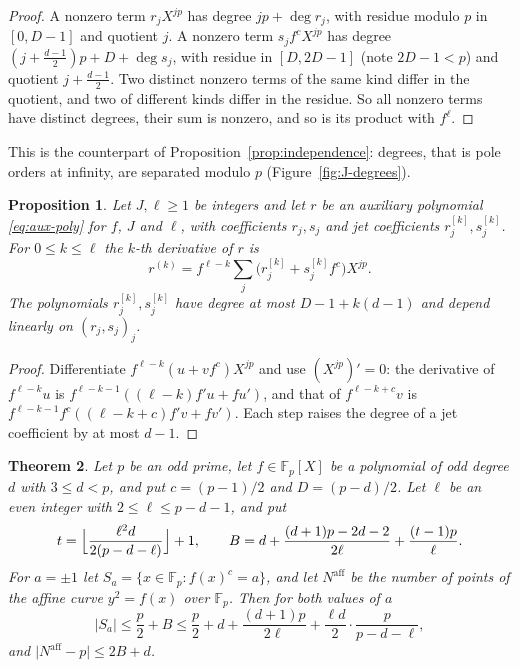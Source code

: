 \documentclass[11pt]{amsbook}
\theoremstyle{plain}
\newtheorem{theorem}{Theorem}[section]
\newtheorem{proposition}[theorem]{Proposition}
\theoremstyle{definition}
\theoremstyle{remark}
\numberwithin{equation}{section}
\numberwithin{figure}{chapter}
\numberwithin{table}{chapter}
\newcommand{\F}{\mathbb{F}}
\begin{document}
\begin{proof}
A nonzero term $r_jX^{jp}$ has degree $jp+\deg r_j$, with residue
modulo $p$ in $[0,D-1]$ and quotient $j$. A nonzero term
$s_jf^cX^{jp}$ has degree $(j+\frac{d-1}2)p+D+\deg s_j$, with
residue in $[D,2D-1]$ (note $2D-1<p$) and quotient
$j+\frac{d-1}2$. Two distinct nonzero terms of the same kind differ
in the quotient, and two of different kinds differ in the residue.
So all nonzero terms have distinct degrees, their sum is nonzero,
and so is its product with $f^\ell$.
\end{proof}

This is the counterpart of Proposition~\ref{prop:independence}:
degrees, that is pole orders at infinity, are separated modulo $p$
(Figure~\ref{fig:J-degrees}).

\begin{proposition}\label{prop:J-jets}
Let $J,\ell\ge1$ be integers and let $r$ be an auxiliary polynomial
\eqref{eq:aux-poly} for $f$, $J$ and $\ell$, with coefficients
$r_j,s_j$ and jet coefficients $r_j^{[k]},s_j^{[k]}$. For
$0\le k\le\ell$ the $k$-th
derivative of $r$ is
\[
r^{(k)}=f^{\ell-k}\sum_j\bigl(r_j^{[k]}+s_j^{[k]}f^c\bigr)X^{jp}.
\]
The polynomials $r_j^{[k]},s_j^{[k]}$ have degree at most
$D-1+k(d-1)$ and depend linearly on $(r_j,s_j)_j$.
\end{proposition}

\begin{proof}
Differentiate $f^{\ell-k}(u+vf^c)X^{jp}$ and use $(X^{jp})'=0$:
the derivative of $f^{\ell-k}u$ is
$f^{\ell-k-1}((\ell-k)f'u+fu')$, and that of $f^{\ell-k+c}v$ is
$f^{\ell-k-1}f^c((\ell-k+c)f'v+fv')$. Each step raises the degree
of a jet coefficient by at most $d-1$.
\end{proof}

\begin{theorem}\label{thm:variantJ}\label{def:tJB}
Let $p$ be an odd prime, let $f\in\F_p[X]$ be a polynomial of odd
degree $d$ with $3\le d<p$, and put $c=(p-1)/2$ and $D=(p-d)/2$. Let
$\ell$ be an even integer with $2\le\ell\le p-d-1$, and put
\[
t=\Bigl\lfloor\frac{\ell^2d}{2(p-d-\ell)}\Bigr\rfloor+1,\qquad
B=d+\frac{(d+1)p-2d-2}{2\ell}+\frac{(t-1)p}{\ell}.
\]
For $a=\pm1$ let $S_a=\{x\in\F_p:f(x)^c=a\}$, and let
$N^{\mathrm{aff}}$ be the number
of points of the affine curve $y^2=f(x)$ over $\F_p$. Then for
both values of $a$
\begin{equation}\label{eq:variantJ}
\lvert S_a\rvert\le\frac p2+B
\le\frac p2+d+\frac{(d+1)p}{2\ell}+\frac{\ell d}2\cdot
\frac p{p-d-\ell},
\end{equation}
and $\lvert N^{\mathrm{aff}}-p\rvert\le2B+d$.
\end{theorem}
\end{document}
